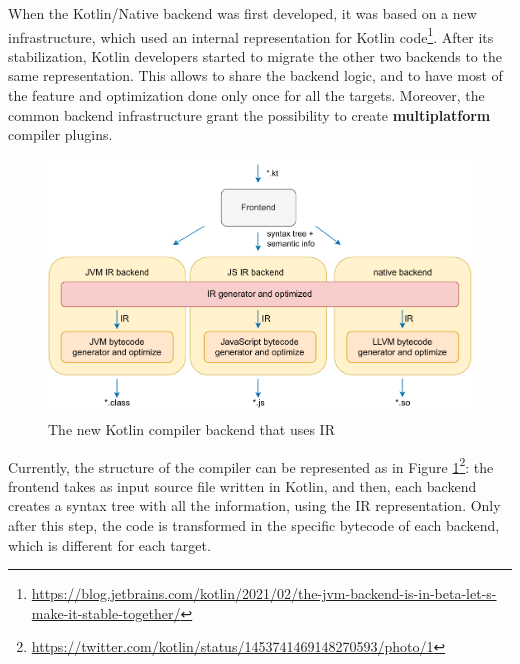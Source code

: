 When the Kotlin/Native backend was first developed, it was based on a new infrastructure, which used an internal representation for Kotlin code\footnote{\url{https://blog.jetbrains.com/kotlin/2021/02/the-jvm-backend-is-in-beta-let-s-make-it-stable-together/}}. After its stabilization, Kotlin developers started to migrate the other two backends to the same representation. This allows to share the backend logic, and to have most of the feature and optimization done only once for all the targets. Moreover, the common backend infrastructure grant the possibility to create \textbf{multiplatform} compiler plugins.

\begin{figure}[!ht]
    \centering
    \includegraphics[scale=0.9]{document/chapters/2-metaprogramming/images/kotlin_compiler_plugin_ir_representation.pdf}
    \caption{The new Kotlin compiler backend that uses IR}
    \label{fig:kotlin_compiler_plugin_ir_representation}
\end{figure}

Currently, the structure of the compiler can be represented as in Figure \ref{fig:kotlin_compiler_plugin_ir_representation}\footnote{\url{https://twitter.com/kotlin/status/1453741469148270593/photo/1}}: the frontend takes as input source file written in Kotlin, and then, each backend creates a syntax tree with all the information, using the IR representation. Only after this step, the code is transformed in the specific bytecode of each backend, which is different for each target.

